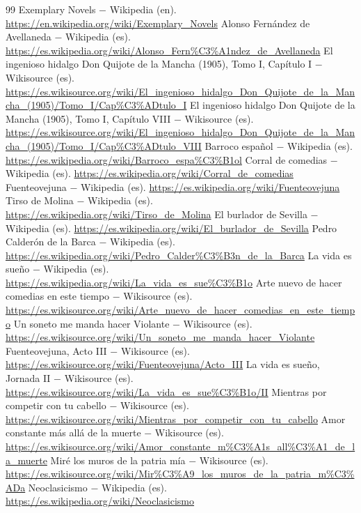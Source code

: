 \documentclass{book}
\begin{document}
\begin{thebibliography}{99}
 Exemplary Novels \(-\) Wikipedia (en). \url{https://en.wikipedia.org/wiki/Exemplary_Novels}
 Alonso Fernández de Avellaneda \(-\) Wikipedia (es). \url{https://es.wikipedia.org/wiki/Alonso_Fern%C3%A1ndez_de_Avellaneda}
 El ingenioso hidalgo Don Quijote de la Mancha (1905), Tomo I, Capítulo I \(-\) Wikisource (es). \url{https://es.wikisource.org/wiki/El_ingenioso_hidalgo_Don_Quijote_de_la_Mancha_(1905)/Tomo_I/Cap%C3%ADtulo_I}
 El ingenioso hidalgo Don Quijote de la Mancha (1905), Tomo I, Capítulo VIII \(-\) Wikisource (es). \url{https://es.wikisource.org/wiki/El_ingenioso_hidalgo_Don_Quijote_de_la_Mancha_(1905)/Tomo_I/Cap%C3%ADtulo_VIII}
 Barroco español \(-\) Wikipedia (es). \url{https://es.wikipedia.org/wiki/Barroco_espa%C3%B1ol}
 Corral de comedias \(-\) Wikipedia (es). \url{https://es.wikipedia.org/wiki/Corral_de_comedias}
 Fuenteovejuna \(-\) Wikipedia (es). \url{https://es.wikipedia.org/wiki/Fuenteovejuna}
 Tirso de Molina \(-\) Wikipedia (es). \url{https://es.wikipedia.org/wiki/Tirso_de_Molina}
 El burlador de Sevilla \(-\) Wikipedia (es). \url{https://es.wikipedia.org/wiki/El_burlador_de_Sevilla}
 Pedro Calderón de la Barca \(-\) Wikipedia (es). \url{https://es.wikipedia.org/wiki/Pedro_Calder%C3%B3n_de_la_Barca}
 La vida es sueño \(-\) Wikipedia (es). \url{https://es.wikipedia.org/wiki/La_vida_es_sue%C3%B1o}
 Arte nuevo de hacer comedias en este tiempo \(-\) Wikisource (es). \url{https://es.wikisource.org/wiki/Arte_nuevo_de_hacer_comedias_en_este_tiempo}
 Un soneto me manda hacer Violante \(-\) Wikisource (es). \url{https://es.wikisource.org/wiki/Un_soneto_me_manda_hacer_Violante}
 Fuenteovejuna, Acto III \(-\) Wikisource (es). \url{https://es.wikisource.org/wiki/Fuenteovejuna/Acto_III}
 La vida es sueño, Jornada II \(-\) Wikisource (es). \url{https://es.wikisource.org/wiki/La_vida_es_sue%C3%B1o/II}
 Mientras por competir con tu cabello \(-\) Wikisource (es). \url{https://es.wikisource.org/wiki/Mientras_por_competir_con_tu_cabello}
 Amor constante más allá de la muerte \(-\) Wikisource (es). \url{https://es.wikisource.org/wiki/Amor_constante_m%C3%A1s_all%C3%A1_de_la_muerte}
 Miré los muros de la patria mía \(-\) Wikisource (es). \url{https://es.wikisource.org/wiki/Mir%C3%A9_los_muros_de_la_patria_m%C3%ADa}
 Neoclasicismo \(-\) Wikipedia (es). \url{https://es.wikipedia.org/wiki/Neoclasicismo}

\end{thebibliography}
\end{document}
